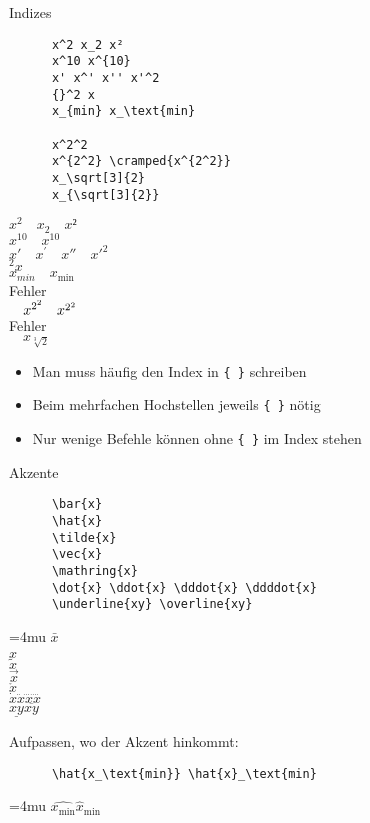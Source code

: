 \begin{frame}[fragile]{Indizes}
  \begin{CodeExample}{0.50}
    \begin{lstlisting}
      x^2 x_2 x²
      x^10 x^{10}
      x' x^' x'' x'^2
      {}^2 x
      x_{min} x_\text{min}

      x^2^2
      x^{2^2} \cramped{x^{2^2}}
      x_\sqrt[3]{2}
      x_{\sqrt[3]{2}}
    \end{lstlisting}
  \CodeResult
    $x^2 \quad x_2 \quad x²$ \\
    $x^10 \quad x^{10}$ \\
    $x' \quad x^{'} \quad x'' \quad x'^2$ \\
    ${}^2 x$ \\
    $x_{min} \quad x_\text{min}$ \\[\baselineskip]
    \alert{Fehler}\\
    $\quad x^{2^2} \quad \cramped{x^{2^2}}$ \\
    \alert{Fehler} \\
    $\quad x_{\sqrt[3]{2}}$
  \end{CodeExample}
  \begin{itemize}
    \item Man muss häufig den Index in \lstinline+{ }+ schreiben
    \item Beim mehrfachen Hochstellen jeweils \lstinline+{ }+ nötig
    \item Nur wenige Befehle können ohne \lstinline+{ }+ im Index stehen
  \end{itemize}
\end{frame}

\begin{frame}[fragile]{Akzente}
  \begin{CodeExample}{0.70}
    \begin{lstlisting}
      \bar{x}
      \hat{x}
      \tilde{x}
      \vec{x}
      \mathring{x}
      \dot{x} \ddot{x} \dddot{x} \ddddot{x}
      \underline{xy} \overline{xy}
    \end{lstlisting}
  \CodeResult
    \Umathordordspacing\textstyle=4mu
    $\bar{x}$ \\
    $\hat{x}$ \\
    $\tilde{x}$ \\
    $\vec{x}$ \\
    $\mathring{x}$ \\
    $\dot{x} \ddot{x} \dddot{x} \ddddot{x}$ \\
    $\underline{xy} \overline{xy}$
  \end{CodeExample}
  Aufpassen, wo der Akzent hinkommt:
  \begin{CodeExample}{0.7}
    \begin{lstlisting}
      \hat{x_\text{min}} \hat{x}_\text{min}
    \end{lstlisting}
  \CodeResult
    \Umathordordspacing\textstyle=4mu
    $\hat{x_\text{min}} \hat{x}_\text{min}$ \\
  \end{CodeExample}
\end{frame}

